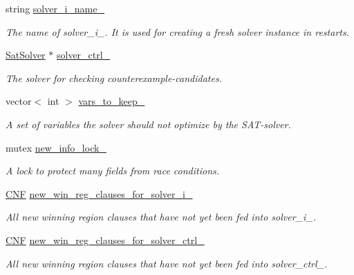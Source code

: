 \begin{DoxyCompactItemize}
string \hyperlink{classClauseExplorerSAT_a8d32081c8c672ce55587dae858b2ccb1}{solver\-\_\-i\-\_\-name\-\_\-}
\begin{DoxyCompactList}\small\item\em The name of solver\-\_\-i\-\_\-. It is used for creating a fresh solver instance in restarts. \end{DoxyCompactList}\item 
\hyperlink{classSatSolver}{Sat\-Solver} $\ast$ \hyperlink{classClauseExplorerSAT_a7884d171120e8397140e30fdc28767eb}{solver\-\_\-ctrl\-\_\-}
\begin{DoxyCompactList}\small\item\em The solver for checking counterexample-\/candidates. \end{DoxyCompactList}\item 
vector$<$ int $>$ \hyperlink{classClauseExplorerSAT_a9d9c6caf1a451ed22a096c2ef5e8bbc2}{vars\-\_\-to\-\_\-keep\-\_\-}
\begin{DoxyCompactList}\small\item\em A set of variables the solver should not optimize by the S\-A\-T-\/solver. \end{DoxyCompactList}\item 
mutex \hyperlink{classClauseExplorerSAT_a674651f8fbf9ed93264ce3369bd5332b}{new\-\_\-info\-\_\-lock\-\_\-}
\begin{DoxyCompactList}\small\item\em A lock to protect many fields from race conditions. \end{DoxyCompactList}\item 
\hyperlink{classCNF}{C\-N\-F} \hyperlink{classClauseExplorerSAT_a2c3e73b4c0529b9139354a965d34e81f}{new\-\_\-win\-\_\-reg\-\_\-clauses\-\_\-for\-\_\-solver\-\_\-i\-\_\-}
\begin{DoxyCompactList}\small\item\em All new winning region clauses that have not yet been fed into solver\-\_\-i\-\_\-. \end{DoxyCompactList}\item 
\hyperlink{classCNF}{C\-N\-F} \hyperlink{classClauseExplorerSAT_a7d923928f3cb6209b29f5cc5104b5fe2}{new\-\_\-win\-\_\-reg\-\_\-clauses\-\_\-for\-\_\-solver\-\_\-ctrl\-\_\-}
\begin{DoxyCompactList}\small\item\em All new winning region clauses that have not yet been fed into solver\-\_\-ctrl\-\_\-. \end{DoxyCompactList}\item 

\end{DoxyCompactItemize}
